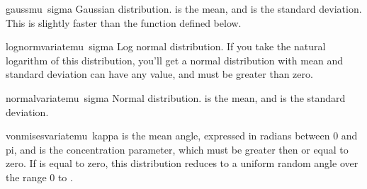 \begin{funcdesc}{gauss}{mu\, sigma}
Gaussian distribution.   is the mean, and  is the
standard deviation.  This is slightly faster than the
 function defined below.
\end{funcdesc}

\begin{funcdesc}{lognormvariate}{mu\, sigma}
Log normal distribution.  If you take the natural logarithm of this
distribution, you'll get a normal distribution with mean  and
standard deviation    can have any value, and 
must be greater than zero.  
\end{funcdesc}

\begin{funcdesc}{normalvariate}{mu\, sigma}
Normal distribution.   is the mean, and  is the
standard deviation.
\end{funcdesc}

\begin{funcdesc}{vonmisesvariate}{mu\, kappa}
 is the mean angle, expressed in radians between 0 and pi,
and  is the concentration parameter, which must be greater
then or equal to zero.  If  is equal to zero, this
distribution reduces to a uniform random angle over the range 0 to
.
\end{funcdesc}
